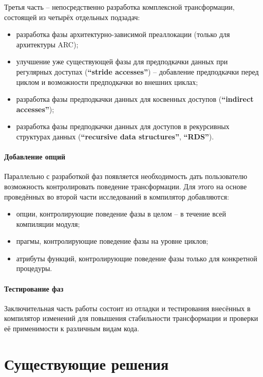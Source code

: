 \documentclass[12pt,a4paper]{article}
\begin{document}
Третья часть -- непосредственно разработка комплексной трансформации, состоящей из четырёх отдельных подзадач:
\begin{itemize}
\item разработка фазы архитектурно-зависимой преаллокации (только для архитектуры ARC);
\item улучшение уже существующей фазы для предподкачки данных при регулярных доступах (\textbf{``stride accesses''}) -- добавление предподкачки перед циклом и возможности предподкачки во внешних циклах;
\item разработка фазы предподкачки данных для косвенных доступов (\textbf{``indirect accesses''});
\item разработка фазы предподкачки данных для доступов в рекурсивных структурах данных (\textbf{``recursive data structures''}, \textbf{``RDS''}).
\end{itemize}

\paragraph{Добавление опций}

Параллельно с разработкой фаз появляется необходимость дать пользователю возможность контролировать поведение трансформации. Для этого на основе проведённых во второй части исследований в компилятор добавляются:

\begin{itemize}
\item опции, контролирующие поведение фазы в целом -- в течение всей компиляции модуля;
\item прагмы, контролирующие поведение фазы на уровне циклов;
\item атрибуты функций, контролирующие поведение фазы только для конкретной процедуры.
\end{itemize}

\paragraph{Тестирование фаз}

Заключительная часть работы состоит из отладки и тестирования внесённых в компилятор изменений для повышения стабильности трансформации и проверки её применимости к различным видам кода.

\section{Существующие решения}
\end{document}
